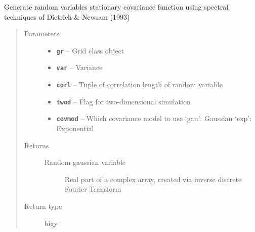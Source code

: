 \documentclass[letterpaper,10pt,english]{sphinxmanual}
\begin{document}
\begin{fulllineitems}
\label{hyvr:hyvr.hyvr.utils.specsim}
Generate random variables stationary covariance function using spectral techniques of Dietrich \& Newsam (1993)
\begin{quote}\begin{description}
\item[{Parameters}] \leavevmode\begin{itemize}
\item {} 
\textbf{\texttt{gr}} -- Grid class object

\item {} 
\textbf{\texttt{var}} -- Variance

\item {} 
\textbf{\texttt{corl}} -- Tuple of correlation length of random variable

\item {} 
\textbf{\texttt{twod}} -- Flag for two-dimensional simulation

\item {} 
\textbf{\texttt{covmod}} -- Which covariance model to use
`gau': Gaussian
`exp': Exponential

\end{itemize}

\item[{Returns}] \leavevmode
\begin{description}
\item[{Random gaussian variable}] \leavevmode
Real part of a complex array, created via inverse discrete Fourier Transform

\end{description}


\item[{Return type}] \leavevmode
bigy

\end{description}\end{quote}

\end{fulllineitems}

\end{document}
